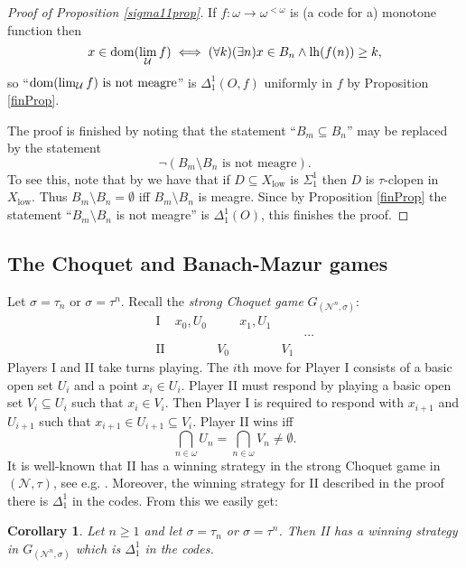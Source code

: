 \documentclass[11pt, english]{article}
\newtheorem{cor}{Corollary}
\DeclareMathOperator{\lh}{lh} \DeclareMathOperator{\inn}{Inn}
\DeclareMathOperator{\low}{low}
\newcommand{\baire}{\mathscr N}
\begin{document}
\begin{proof}[Proof of Proposition \ref{sigma11prop}]
If $f:\omega\to\omega^{<\omega}$ is (a code for a) monotone
function then
$$
x\in\dom(\lim_{\mathcal U} f)\iff(\forall k)(\exists n) x\in
B_n\wedge \lh(f(n))\geq k,
$$
so ``$\operatorname{dom}(\lim_{\mathcal U} f) \text{ is not meagre}$'' is
$\Delta^1_1(O,f)$ uniformly in $f$ by Proposition \ref{finProp}.

The proof is finished by noting that the statement ``$B_m\subseteq
B_n$'' may be replaced by the statement
$$
\neg(B_m\setminus B_n  \text{ is not meagre}).
$$
To see this, note that by \cite[Theorem A.1.6]{gao09} we have that
if $D\subseteq X_{\low}$ is $\Sigma^1_1$ then $D$ is $\tau$-clopen
in $X_{\low}$. Thus $B_m\setminus B_n=\emptyset$ iff $B_m\setminus
B_n$ is meagre. Since by Proposition \ref{finProp} the statement
``$B_m\setminus B_n$ is not meagre'' is $\Delta^1_1(O)$, this
finishes the proof.
\end{proof}

\subsection{The Choquet and Banach-Mazur games}
Let $\sigma=\tau_n$ or $\sigma=\tau^n$. Recall the {\it strong
Choquet game} $G_{(\baire^n,\sigma)}$:
$$
\begin{array}{rlllll}
\mathrm{I} & x_0, U_0 & \   & x_1, U_1\\
  &          &     &          &      & \cdots\\
\mathrm{II} & \       & V_0 &\         &  V_1

\end{array}
$$
Players I and II take turns playing. The $i$th move for Player I
consists of a basic open set $U_i$ and a point $x_i\in U_i$.
Player II must respond by playing a basic open set $V_i\subseteq
U_i$ such that $x_i\in V_i$. Then Player I is required to
respond with $x_{i+1}$ and $U_{i+1}$ such that $x_{i+1}\in
U_{i+1}\subseteq V_i$. Player II wins iff
$$
\bigcap_{n\in\omega} U_n=\bigcap_{n\in\omega} V_n\neq\emptyset.
$$
It is well-known that II has a winning strategy in the strong
Choquet game in $(\baire,\tau)$, see e.g. \cite[Theorem
4.1.5]{gao09}. Moreover, the winning strategy for II described in
the proof there is $\Delta^1_1$ in the codes. From this we easily
get:
\begin{cor}
Let $n\geq 1$ and let $\sigma=\tau_n$ or $\sigma=\tau^n$. Then
{\rm II} has a winning strategy in $G_{(\baire^n,\sigma)}$ which
is $\Delta^1_1$ in the codes.
\end{cor}
\end{document}
